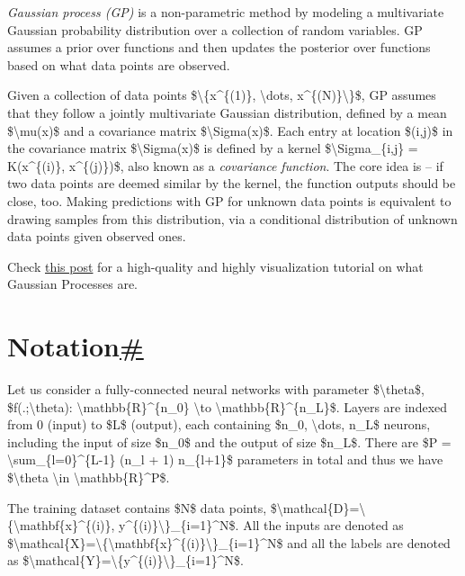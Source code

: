 \emph{Gaussian process (GP)} is a non-parametric method by modeling a multivariate Gaussian probability distribution over a collection of random variables. GP assumes a prior over functions and then updates the posterior over functions based on what data points are observed.

Given a collection of data points \$\textbackslash\{x\^{}\{(1)\}, \textbackslash dots, x\^{}\{(N)\}\textbackslash\}\$, GP assumes that they follow a jointly multivariate Gaussian distribution, defined by a mean \$\textbackslash mu(x)\$ and a covariance matrix \$\textbackslash Sigma(x)\$. Each entry at location \$(i,j)\$ in the covariance matrix \$\textbackslash Sigma(x)\$ is defined by a kernel \$\textbackslash Sigma\_\{i,j\} = K(x\^{}\{(i)\}, x\^{}\{(j)\})\$, also known as a \emph{covariance function}. The core idea is -- if two data points are deemed similar by the kernel, the function outputs should be close, too. Making predictions with GP for unknown data points is equivalent to drawing samples from this distribution, via a conditional distribution of unknown data points given observed ones.

Check \href{https://distill.pub/2019/visual-exploration-gaussian-processes/}{this post} for a high-quality and highly visualization tutorial on what Gaussian Processes are.

\section{\texorpdfstring{Notation\hyperref[notation]{\#}}{Notation\#}}\label{notation}

Let us consider a fully-connected neural networks with parameter \$\textbackslash theta\$, \$f(.;\textbackslash theta): \textbackslash mathbb\{R\}\^{}\{n\_0\} \textbackslash to \textbackslash mathbb\{R\}\^{}\{n\_L\}\$. Layers are indexed from 0 (input) to \$L\$ (output), each containing \$n\_0, \textbackslash dots, n\_L\$ neurons, including the input of size \$n\_0\$ and the output of size \$n\_L\$. There are \$P = \textbackslash sum\_\{l=0\}\^{}\{L-1\} (n\_l + 1) n\_\{l+1\}\$ parameters in total and thus we have \$\textbackslash theta \textbackslash in \textbackslash mathbb\{R\}\^{}P\$.

The training dataset contains \$N\$ data points, \$\textbackslash mathcal\{D\}=\textbackslash\{\textbackslash mathbf\{x\}\^{}\{(i)\}, y\^{}\{(i)\}\textbackslash\}\_\{i=1\}\^{}N\$. All the inputs are denoted as \$\textbackslash mathcal\{X\}=\textbackslash\{\textbackslash mathbf\{x\}\^{}\{(i)\}\textbackslash\}\_\{i=1\}\^{}N\$ and all the labels are denoted as \$\textbackslash mathcal\{Y\}=\textbackslash\{y\^{}\{(i)\}\textbackslash\}\_\{i=1\}\^{}N\$.

